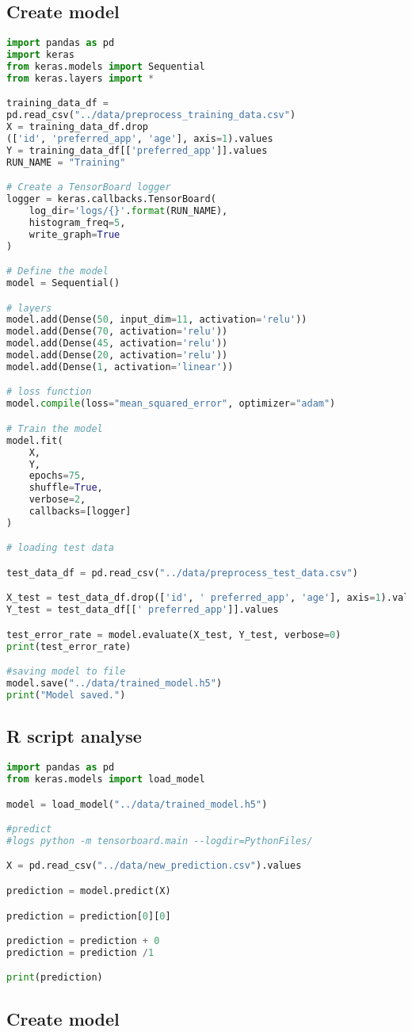 \subsection{Create model} 
\begin{lstlisting}[language=Python]
import pandas as pd
import keras
from keras.models import Sequential
from keras.layers import *

training_data_df = 
pd.read_csv("../data/preprocess_training_data.csv")
X = training_data_df.drop
(['id', 'preferred_app', 'age'], axis=1).values
Y = training_data_df[['preferred_app']].values
RUN_NAME = "Training"

# Create a TensorBoard logger
logger = keras.callbacks.TensorBoard(
    log_dir='logs/{}'.format(RUN_NAME),
    histogram_freq=5,
    write_graph=True
)

# Define the model
model = Sequential()

# layers
model.add(Dense(50, input_dim=11, activation='relu'))
model.add(Dense(70, activation='relu'))
model.add(Dense(45, activation='relu'))
model.add(Dense(20, activation='relu'))
model.add(Dense(1, activation='linear'))

# loss function
model.compile(loss="mean_squared_error", optimizer="adam")

# Train the model
model.fit(
    X,
    Y,
    epochs=75,
    shuffle=True,
    verbose=2,
    callbacks=[logger]
)

# loading test data

test_data_df = pd.read_csv("../data/preprocess_test_data.csv")

X_test = test_data_df.drop(['id', ' preferred_app', 'age'], axis=1).values
Y_test = test_data_df[[' preferred_app']].values

test_error_rate = model.evaluate(X_test, Y_test, verbose=0)
print(test_error_rate)

#saving model to file
model.save("../data/trained_model.h5")
print("Model saved.")
\end{lstlisting}

\subsection{R script analyse} 
\begin{lstlisting}[language=Python]
import pandas as pd
from keras.models import load_model

model = load_model("../data/trained_model.h5")

#predict
#logs python -m tensorboard.main --logdir=PythonFiles/

X = pd.read_csv("../data/new_prediction.csv").values

prediction = model.predict(X)

prediction = prediction[0][0]

prediction = prediction + 0
prediction = prediction /1

print(prediction)
\end{lstlisting}

\subsection{Create model} 
